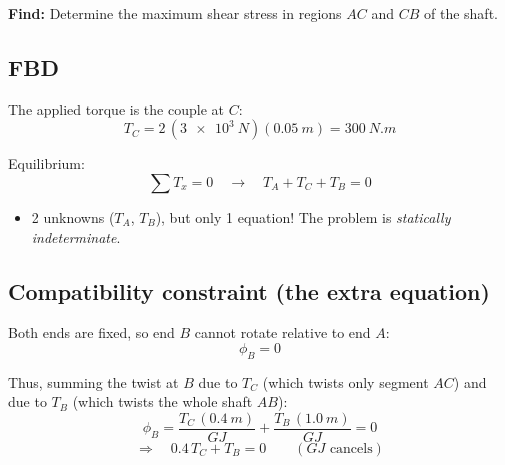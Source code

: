 \documentclass[11pt]{article}
\begin{document}
\noindent
\textbf{Find:} Determine the maximum shear stress in regions $AC$ and $CB$ of the shaft.

\subsection*{FBD}

\begin{center}
\end{center}

\noindent
The applied torque is the couple at $C$:
\[
  T_C = 2\,(\SI{3e3}{N})(\SI{0.05}{m}) = \SI{300}{N.m}
\]

\noindent
Equilibrium:
\[
  \textstyle\sum T_x = 0 \quad\rightarrow\quad T_A + T_C + T_B = 0
\]
\begin{itemize}[label=\then]
  \item 2 unknowns ($T_A$, $T_B$), but only 1 equation! The problem is
        \emph{statically indeterminate}.
\end{itemize}

\subsection*{Compatibility constraint (the extra equation)}

\noindent
Both ends are fixed, so end $B$ cannot rotate relative to end $A$:
\[
  \boxed{\phi_B = 0}
\]

\noindent
Thus, summing the twist at $B$ due to $T_C$ (which twists only segment $AC$) and due to
$T_B$ (which twists the whole shaft $AB$):
\[
  \phi_B = \frac{T_C\,(\SI{0.4}{m})}{GJ} + \frac{T_B\,(\SI{1.0}{m})}{GJ} = 0
\]
\[
  \Rightarrow\quad 0.4\,T_C + T_B = 0
  \qquad (GJ \text{ cancels})
\]
\end{document}
